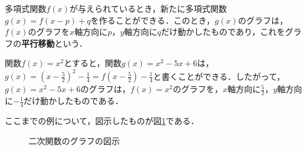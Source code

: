 \begin{definition}[グラフの平行移動]
	多項式関数$f(x)$が与えられているとき，新たに多項式関数$g(x) = f(x-p) + q$を作ることができる．このとき，$g(x)$のグラフは，$f(x)$のグラフを$x$軸方向に$p$，$y$軸方向に$q$だけ動かしたものであり，これをグラフの\textbf{平行移動}という．
\end{definition}
\begin{example*}
	関数$f(x) = x^2$とすると，関数$g(x) = x^2-5x+6$は，$g(x) = \left(x-\frac{5}{2}\right)^2-\frac{1}{4} = f\left(x-\frac{5}{2}\right)-\frac{1}{4}$と書くことができる．したがって，$g(x) = x^2-5x+6$のグラフは，$f(x) = x^2$のグラフを，$x$軸方向に$\frac{5}{2}$，$y$軸方向に$-\frac{1}{4}$だけ動かしたものである．
\end{example*}

ここまでの例について，図示したものが図\ref{fig:quadraticFunction}である．

\vfill
\begin{figure}[!h]
	\centering
	\caption{二次関数のグラフの図示}
	\label{fig:quadraticFunction}
\end{figure}
\clearpage

